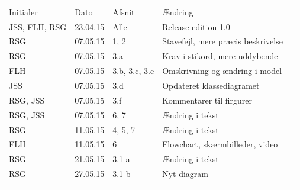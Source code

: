 \documentclass[12pt,a4paper]{article}
\begin{document}
\begin{table}[h]
\begin{tabular}{lllll}
\cline{1-4}
\multicolumn{1}{|l|}{Initialer} & \multicolumn{1}{l|}{Dato} & \multicolumn{1}{l|}{Afsnit} & \multicolumn{1}{l|}{Ændring} &  \\ \cline{1-4}
\multicolumn{1}{|l|}{JSS, FLH, RSG}     & \multicolumn{1}{l|}{23.04.15}     & \multicolumn{1}{l|}{Alle}       & \multicolumn{1}{l|}{Release edition 1.0}        &  \\ \cline{1-4}
\multicolumn{1}{|l|}{RSG}     & \multicolumn{1}{l|}{07.05.15}     & \multicolumn{1}{l|}{1, 2}       & \multicolumn{1}{l|}{Stavefejl, mere præcis beskrivelse}        &  \\ \cline{1-4}
\multicolumn{1}{|l|}{RSG}     & \multicolumn{1}{l|}{07.05.15}     & \multicolumn{1}{l|}{3.a}       & \multicolumn{1}{l|}{Krav i stikord, mere uddybende}        &  \\ \cline{1-4}
\multicolumn{1}{|l|}{FLH}     & \multicolumn{1}{l|}{07.05.15}     & \multicolumn{1}{l|}{3.b, 3.c, 3.e}       & \multicolumn{1}{l|}{Omskrivning og ændring i model}        &  \\ \cline{1-4}
\multicolumn{1}{|l|}{JSS}     & \multicolumn{1}{l|}{07.05.15}     & \multicolumn{1}{l|}{3.d}       & \multicolumn{1}{l|}{Opdateret klassediagramet}        &  \\ \cline{1-4}
\multicolumn{1}{|l|}{RSG, JSS}     & \multicolumn{1}{l|}{07.05.15}     & \multicolumn{1}{l|}{3.f}       & \multicolumn{1}{l|}{Kommentarer til firgurer}        &  \\ \cline{1-4}
\multicolumn{1}{|l|}{RSG, JSS}     & \multicolumn{1}{l|}{07.05.15}     & \multicolumn{1}{l|}{6, 7}       & \multicolumn{1}{l|}{Ændring i tekst}        &  \\ \cline{1-4}
\multicolumn{1}{|l|}{RSG}     & \multicolumn{1}{l|}{11.05.15}     & \multicolumn{1}{l|}{4, 5, 7}       & \multicolumn{1}{l|}{Ændring i tekst}        &  \\ \cline{1-4}
\multicolumn{1}{|l|}{FLH}     & \multicolumn{1}{l|}{11.05.15}     & \multicolumn{1}{l|}{6}       & \multicolumn{1}{l|}{Flowchart, skærmbilleder, video}        &  \\ \cline{1-4}
\multicolumn{1}{|l|}{RSG}     & \multicolumn{1}{l|}{21.05.15}     & \multicolumn{1}{l|}{3.1 a}       & \multicolumn{1}{l|}{Ændring i tekst}        &  \\ \cline{1-4}
\multicolumn{1}{|l|}{RSG}     & \multicolumn{1}{l|}{27.05.15}     & \multicolumn{1}{l|}{3.1 b}       & \multicolumn{1}{l|}{Nyt diagram}        &  \\ \cline{1-4}
                           &                           &                             &                              & 
\end{tabular}
\end{table}
\end{document}
